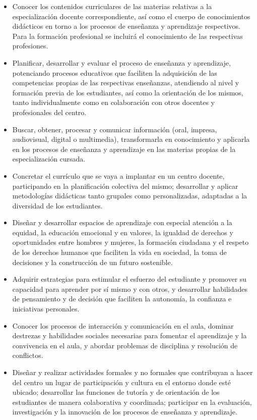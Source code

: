 \documentclass[12pt,a4paper]{article}
\begin{document}
\begin{itemize}
  \item Conocer los contenidos curriculares de las materias relativas a la especialización docente correspondiente, así como el cuerpo de conocimientos didácticos en torno a los procesos de enseñanza y aprendizaje respectivos. Para la formación profesional se incluirá el conocimiento de las respectivas profesiones.
  \item Planificar, desarrollar y evaluar el proceso de enseñanza y aprendizaje, potenciando procesos educativos que faciliten la adquisición de las competencias propias de las respectivas enseñanzas, atendiendo al nivel y formación previa de los estudiantes, así como la orientación de los mismos, tanto individualmente como en colaboración con otros docentes y profesionales del centro.
  \item Buscar, obtener, procesar y comunicar información (oral, impresa, audiovisual, digital o multimedia), transformarla en conocimiento y aplicarla en los procesos de enseñanza y aprendizaje en las materias propias de la especialización cursada.
  \item Concretar el currículo que se vaya a implantar en un centro docente, participando en la planificación colectiva del mismo; desarrollar y aplicar metodologías didácticas tanto grupales como personalizadas, adaptadas a la diversidad de los estudiantes.
  \item Diseñar y desarrollar espacios de aprendizaje con especial atención a la equidad, la educación emocional y en valores, la igualdad de derechos y oportunidades entre hombres y mujeres, la formación ciudadana y el respeto de los derechos humanos que faciliten la vida en sociedad, la toma de decisiones y la construcción de un futuro sostenible.
  \item Adquirir estrategias para estimular el esfuerzo del estudiante y promover su capacidad para aprender por sí mismo y con otros, y desarrollar habilidades de pensamiento y de decisión que faciliten la autonomía, la confianza e iniciativas personales.
  \item Conocer los procesos de interacción y comunicación en el aula, dominar destrezas y habilidades sociales necesarias para fomentar el aprendizaje y la convivencia en el aula, y abordar problemas de disciplina y resolución de conflictos.
  \item Diseñar y realizar actividades formales y no formales que contribuyan a hacer del centro un lugar de participación y cultura en el entorno donde esté ubicado; desarrollar las funciones de tutoría y de orientación de los estudiantes de manera colaborativa y coordinada; participar en la evaluación, investigación y la innovación de los procesos de enseñanza y aprendizaje.

\end{itemize}
\end{document}
